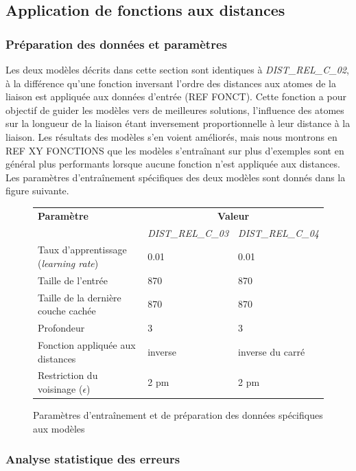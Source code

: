 \subsection{Application de fonctions aux distances}

\subsubsection{Préparation des données et paramètres}
Les deux modèles décrits dans cette section sont identiques à \emph{DIST\_REL\_C\_02}, à la différence qu'une fonction inversant l'ordre des distances aux atomes de la liaison est appliquée aux données d'entrée (REF FONCT). Cette fonction a pour objectif de guider les modèles vers de meilleures solutions, l'influence des atomes sur la longueur de la liaison étant inversement proportionnelle à leur distance à la liaison. Les résultats des modèles s'en voient améliorés, mais nous montrons en REF XY FONCTIONS que les modèles s'entraînant sur plus d'exemples sont en général plus performants lorsque aucune fonction n'est appliquée aux distances.\\
Les paramètres d'entraînement spécifiques des deux modèles sont donnés dans la figure suivante.

\begin{figure}[!h]

	\centering
	\begin{tabular}{|l|l|l|}
		\hline
		\textbf{Paramètre} & \multicolumn{2}{|c|}{\textbf{Valeur}} \\ 
		 & \emph{DIST\_REL\_C\_03} & \emph{DIST\_REL\_C\_04} \\ \hline
		Taux d'apprentissage (\emph{learning rate}) & 0.01 & 0.01\\ \hline
		Taille de l'entrée & 870 & 870\\ \hline
		Taille de la dernière couche cachée & 870 & 870\\ \hline
		Profondeur & 3 & 3\\ \hline
		Fonction appliquée aux distances & inverse & inverse du carré\\ \hline
		Restriction du voisinage ($\epsilon$) & 2 pm & 2 pm\\ \hline
	\end{tabular}
	
	\caption{Paramètres d'entraînement et de préparation des données spécifiques aux modèles}
\end{figure}

\subsubsection{Analyse statistique des erreurs}

